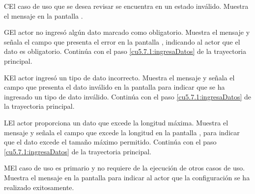  \begin{UCtrayectoriaA}{C}{El caso de uso que se desea revisar se encuentra en un estado inválido.}
    \UCpaso[\UCsist] Muestra el mensaje  en la pantalla .
 \end{UCtrayectoriaA}

 \begin{UCtrayectoriaA}{G}{El actor no ingresó algún dato marcado como obligatorio.}
    \UCpaso[\UCsist] Muestra el mensaje  y señala el campo que presenta el error en la pantalla 
	    , indicando al actor que el dato es obligatorio.
    \UCpaso[] Continúa con el paso \ref{cu5.7.1:ingresaDatos} de la trayectoria principal.
 \end{UCtrayectoriaA}

 \begin{UCtrayectoriaA}{K}{El actor ingresó un tipo de dato incorrecto.}
    \UCpaso[\UCsist] Muestra el mensaje  y señala el campo que presenta el dato inválido en la 
    pantalla  para indicar que se ha ingresado un tipo de dato inválido.
    \UCpaso[] Continúa con el paso \ref{cu5.7.1:ingresaDatos} de la trayectoria principal.
 \end{UCtrayectoriaA}
 \begin{UCtrayectoriaA}{L}{El actor proporciona un dato que excede la longitud máxima.}
    \UCpaso[\UCsist] Muestra el mensaje  y señala el campo que excede la 
    longitud en la pantalla , para indicar que el dato excede el tamaño máximo permitido.
    \UCpaso[] Continúa con el paso \ref{cu5.7.1:ingresaDatos} de la trayectoria principal.
 \end{UCtrayectoriaA}
 \begin{UCtrayectoriaA}{M}{El caso de uso es primario y no requiere de la ejecución de otros casos de uso.}
    \UCpaso[\UCsist] Muestra el mensaje  en la pantalla  para indicar al actor que la configuración se ha realizado exitosamente.
 \end{UCtrayectoriaA}
 